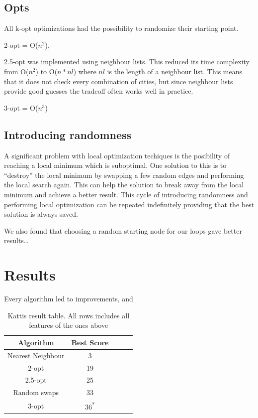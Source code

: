 \documentclass[paper=a4, fontsize=11pt,numbers=endperiod]{scrartcl} %
\numberwithin{equation}{section} %
\numberwithin{figure}{section} %
\numberwithin{table}{section} %
\begin{document}
\subsection{Opts}
All k-opt optimizations had the possibility to randomize their starting point.

2-opt = O($n^2$), 

2.5-opt was implemented using neighbour lists. This reduced its time complexity from O($n^2$) to O($n*nl$) where $nl$ is the length of a neighbour list. This means that it does not check every combination of cities, but since neighbour lists provide good guesses the tradeoff often works well in practice.

3-opt = O($n^3$)

\subsection{Introducing randomness}
A significant problem with local optimization techiques is the posibility of reaching a local minimum which is suboptimal.
One solution to this is to ``destroy'' the local minimum by swapping a few random edges and performing the local search again.
This can help the solution to break away from the local minimum and achieve a better result.
This cycle of introducing randomness and performing local optimization can be repeated indefinitely providing that the best solution is always saved.

We also found that choosing a random starting node for our loops gave better results\dots


\section{Results}

Every algorithm led to improvements, and 

\begin{table}[h]
  \centering
    \begin{tabular}{|c|c|c|c|c|}
    \hline
    \textbf{Algorithm} & \textbf{Best Score} \\ \hline
    Nearest Neighbour & 3 \\ \hline
    2-opt & 19 \\ \hline
    2.5-opt & 25 \\ \hline
    Random swaps & 33 \\ \hline
    3-opt & 36\textsuperscript{*} \\ \hline
    \end{tabular}
    \caption{Kattis result table. All rows includes all features of the ones above}
    \hspace{10pt}
  \end{table}
\end{document}
